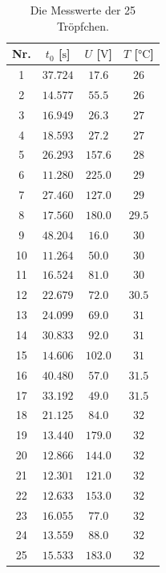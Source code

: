 \documentclass[
  bibliography=totoc,     %
  captions=tableheading,  %
  titlepage=firstiscover, %
]{scrartcl}
\begin{document}
\begin{table}[H]
	\begin{center}
	\caption{Die Messwerte der 25 Tröpfchen.}
	\label{tab:messwerte1}
		\begin{tabular}{cccc}
			\toprule
			{Nr.} & {$t_0$} {[$\si{\second}$]} & {$U$ [$\si{\volt}$]}
      & {$T$ [$\si{\celsius}$]}\\
			\midrule
			1  & $37.724$ & $17.6$ & $26$ \\
			2  & $14.577$ & $55.5$ & $26$ \\
			3  & $16.949$ & $26.3$ & $27$ \\
			4  & $18.593$ & $27.2$ & $27$ \\
			5  & $26.293$ & $157.6$ & $28$ \\
			6  & $11.280$ & $225.0$ & $29$ \\
			7  & $27.460$ & $127.0$ & $29$ \\
			8  & $17.560$ & $180.0$ & $29.5$ \\
			9  & $48.204$ & $16.0$ & $30$ \\
			10 & $11.264$ & $50.0$ & $30$ \\
			11 & $16.524$ & $81.0$ & $30$ \\
			12 & $22.679$ & $72.0$ & $30.5$ \\
			13 & $24.099$ & $69.0$ & $31$ \\
			14 & $30.833$ & $92.0$ & $31$ \\
			15 & $14.606$ & $102.0$ & $31$ \\
			16 & $40.480$ & $57.0$ & $31.5$ \\
			17 & $33.192$ & $49.0$ & $31.5$ \\
			18 & $21.125$ & $84.0$ & $32$ \\
			19 & $13.440$ & $179.0$ & $32$ \\
			20 & $12.866$ & $144.0$ & $32$ \\
			21 & $12.301$ & $121.0$ & $32$ \\
			22 & $12.633$ & $153.0$ & $32$ \\
			23 & $16.055$ & $77.0$ & $32$ \\
			24 & $13.559$ & $88.0$ & $32$ \\
			25 & $15.533$ & $183.0$ & $32$ \\
			\bottomrule
		\end{tabular}
	\end{center}
\end{table}
\end{document}
